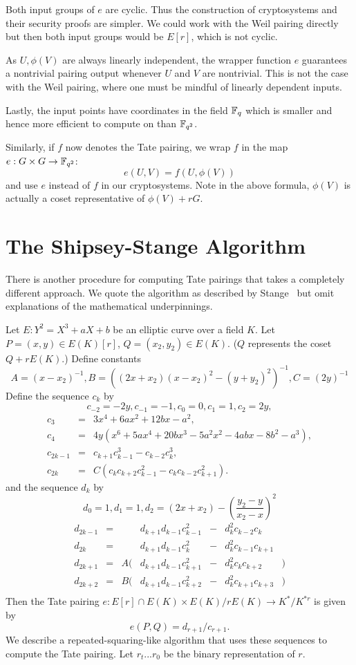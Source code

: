 Both input groups of $e$ are cyclic.
Thus the construction of cryptosystems and their
security proofs are simpler. We could work with the
Weil pairing directly but then both input groups would be $E[r]$,
which is not cyclic.

As $U, \phi(V)$ are always linearly independent,
the wrapper function $e$ guarantees
a nontrivial pairing output whenever $U$ and $V$ are nontrivial.
This is not the case with the Weil pairing,
where one must be mindful of linearly dependent inputs.

Lastly, the input points have coordinates in the field $\mathbb{F}_q$ which is
smaller and hence more efficient to compute on than $\mathbb{F}_{q^2}$.

Similarly, if $f$ now denotes the Tate pairing,
we wrap $f$ in the map
$e : G\times G \rightarrow \mathbb{F}_{q^2}$:
\[ e(U, V) = f(U, \phi(V)) \]
and use $e$ instead of $f$ in our cryptosystems. Note in the above
formula, $\phi(V)$ is actually a coset representative of $\phi(V) + rG$.

\section {The Shipsey-Stange Algorithm}
There is another procedure for computing Tate pairings that takes a completely
different approach. We quote the algorithm as described by Stange~\cite{stange}
but omit explanations of the mathematical underpinnings.

Let $E:Y^2 = X^3 + aX + b$ be an elliptic curve over a field $K$.
Let $P=(x, y) \in E(K)[r]$, $Q=(x_2, y_2) \in E(K)$. ($Q$ represents the
coset $Q + rE(K)$.)
Define constants
\[
    A = (x - x_2)^{-1},
    B = \left((2x + x_2)(x - x_2)^2 - (y + y_2)^2\right)^{-1},
    C = (2 y)^{-1}
\]
Define the sequence $c_k$ by
\[
    c_{-2} = -2y,
    c_{-1} = -1,
    c_0 = 0,
    c_1 = 1,
    c_2 = 2 y,
\]
\[
\begin{array}{lcl}
    c_3 &=& 3 x^4 + 6ax^2 + 12bx - a^2, \\
    c_4 &=& 4y(x^6+5ax^4+20bx^3-5a^2x^2-4abx-8b^2-a^3), \\
    c_{2k-1} &=& c_{k+1} c_{k-1}^3 - c_{k-2} c_k^3, \\
    c_{2k} &=& C(c_k c_{k+2} c_{k-1}^2 - c_k c_{k-2} c_{k+1}^2).
\end{array}
\]
and the sequence $d_k$ by
\[
    d_0 = 1,
    d_1 = 1,
    d_2 = (2x+x_2) - \left( \frac{y_2-y}{x_2-x} \right) ^2
\]
\[
\begin{array}{lcrlcll}
    d_{2k-1} &=& & d_{k+1} d_{k-1} c_{k-1}^2 &-& d_k^2 c_{k-2} c_{k}& \\ 
    d_{2k} &=& & d_{k+1} d_{k-1} c_{k}^2 &-& d_k^2 c_{k-1} c_{k+1}& \\
    d_{2k+1} &=& A(& d_{k+1} d_{k-1} c_{k+1}^2 &-& d_k^2 c_{k} c_{k+2}&) \\
    d_{2k+2} &=& B(& d_{k+1} d_{k-1} c_{k+2}^2 &-& d_k^2 c_{k+1} c_{k+3}&) \\
\end{array}
\]
Then the Tate pairing
$
e : E[r] \cap E(K) \times
E(K) / r E(K) \rightarrow
K^* / K^{*r}
$
is given by
\[
e(P,Q) = d_{r+1}/c_{r+1}.
\]
We describe a repeated-squaring-like algorithm that uses these sequences
to compute the Tate pairing.
Let $r_t ... r_0$ be the binary representation of $r$.

